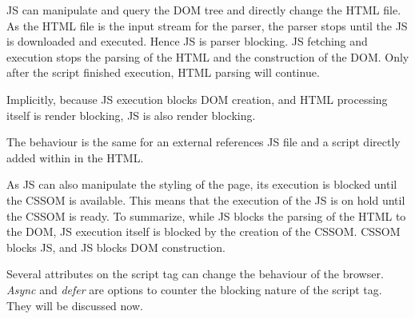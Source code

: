 JS can manipulate and query the DOM tree and directly change the HTML file.
As the HTML file is the input stream for the parser,  the parser stops until the JS is downloaded and executed. %
Hence JS is parser blocking.
JS fetching and execution stops the parsing of the HTML and the construction of the DOM.
Only after the script finished execution, HTML parsing will continue.

Implicitly, because JS execution blocks DOM creation, and HTML processing itself is render blocking, JS is also render blocking. %


The behaviour is the same for an external references JS file and a script directly added within in the HTML.









As JS can also manipulate the styling of the page, its execution is blocked until the CSSOM is available.
This means that the execution of the JS is on hold until the CSSOM is ready.
To summarize, while JS blocks the parsing of the HTML to the DOM, JS execution itself is blocked by the creation of the CSSOM.
CSSOM blocks JS, and JS blocks DOM construction. %

Several attributes on the script tag can change the behaviour of the browser.
\textit{Async} and \textit{defer} are options to counter the blocking nature of the script tag.
They will be discussed now.\\




